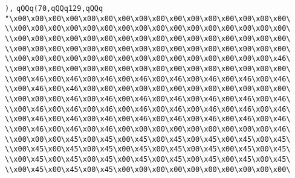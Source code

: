 \verb|),|\newline
\verb|qQQq(70,qQQq129,qQQq|\newline
\verb|"\x00\x00\x00\x00\x00\x00\x00\x00\x00\x00\x00\x00\x00\x00\x00\x00\|\newline
\verb|\\x00\x00\x00\x00\x00\x00\x00\x00\x00\x00\x00\x00\x00\x00\x00\x00\|\newline
\verb|\\x00\x00\x00\x00\x00\x00\x00\x00\x00\x00\x00\x00\x00\x00\x00\x00\|\newline
\verb|\\x00\x00\x00\x00\x00\x00\x00\x00\x00\x00\x00\x00\x00\x00\x00\x00\|\newline
\verb|\\x00\x00\x00\x00\x00\x00\x00\x00\x00\x00\x00\x00\x00\x00\x00\x46\|\newline
\verb|\\x00\x00\x00\x00\x00\x00\x00\x00\x00\x00\x00\x00\x00\x00\x00\x00\|\newline
\verb|\\x00\x46\x00\x46\x00\x46\x00\x46\x00\x46\x00\x46\x00\x46\x00\x46\|\newline
\verb|\\x00\x46\x00\x46\x00\x00\x00\x00\x00\x00\x00\x00\x00\x00\x00\x00\|\newline
\verb|\\x00\x00\x00\x46\x00\x46\x00\x46\x00\x46\x00\x46\x00\x46\x00\x46\|\newline
\verb|\\x00\x46\x00\x46\x00\x46\x00\x46\x00\x46\x00\x46\x00\x46\x00\x46\|\newline
\verb|\\x00\x46\x00\x46\x00\x46\x00\x46\x00\x46\x00\x46\x00\x46\x00\x46\|\newline
\verb|\\x00\x46\x00\x46\x00\x46\x00\x00\x00\x00\x00\x00\x00\x00\x00\x46\|\newline
\verb|\\x00\x00\x00\x45\x00\x45\x00\x45\x00\x45\x00\x45\x00\x45\x00\x45\|\newline
\verb|\\x00\x45\x00\x45\x00\x45\x00\x45\x00\x45\x00\x45\x00\x45\x00\x45\|\newline
\verb|\\x00\x45\x00\x45\x00\x45\x00\x45\x00\x45\x00\x45\x00\x45\x00\x45\|\newline
\verb|\\x00\x45\x00\x45\x00\x45\x00\x00\x00\x00\x00\x00\x00\x00\x00\x00\|\newline
